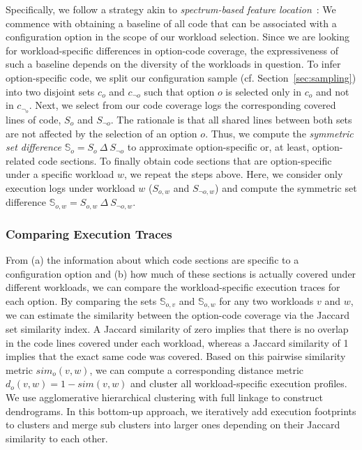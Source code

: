 {{{Specifically, we follow  a strategy akin to  \textit{spectrum-based feature location}~\cite{michelon_spectrum_2021}:
We commence with obtaining a baseline of all code that can be associated with a configuration option in the scope of our workload selection. Since we are looking for workload-specific differences in option-code coverage, the expressiveness of such a baseline depends on the diversity of the workloads in question. To infer option-specific code, we split our configuration sample (cf. Section~\ref{sec:sampling}) into two disjoint sets $c_o$ and $c_{\neg o}$ such that option $o$ is selected only in $c_o$ and not in $c_{\neg_o}$. Next, we select from our code coverage logs the corresponding covered lines of code, $S_o$ and $S_{\neg o}$.  The rationale is that all shared lines between both sets are not affected by the selection of an option $o$. Thus, we compute the \textit{symmetric set difference} $\mathbb{S}_o = S_o~\Delta~S_{\neg o}$ to approximate option-specific or, at least, option-related code sections. To finally obtain code sections that are option-specific under a specific workload $w$, we repeat the steps above. Here, we consider only execution logs under workload $w$ ($S_{o, w}$ and $S_{\neg o, w}$) and compute the symmetric set difference $\mathbb{S}_{o,w}=S_{o,w}~\Delta~S_{\neg o, w}.$


\subsubsection{Comparing Execution Traces}
From (a) the information about which code sections are specific to a configuration option and (b) how much of these sections is actually covered under different workloads, we can compare the workload-specific execution traces for each option. By comparing the sets $\mathbb{S}_{o, v}$ and $\mathbb{S}_{o, w}$ for any two workloads $v$ and $w$, we can estimate the similarity between the option-code coverage via the Jaccard set similarity index. A Jaccard similarity of zero implies that there is no overlap in the code lines covered under each workload, whereas a Jaccard similarity of 1 implies that the exact same code was covered. Based on this pairwise similarity metric $sim_o(v, w)$, we can compute a corresponding distance metric $d_o(v, w) = 1 - sim(v, w)$ and cluster all workload-specific execution profiles. 
We use agglomerative hierarchical clustering with full linkage to construct dendrograms. In this bottom-up approach, we iteratively add execution footprints to clusters and merge sub clusters into larger ones depending on their Jaccard similarity  to each other. 

}}}
